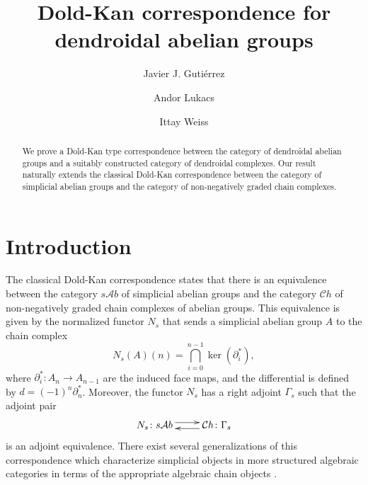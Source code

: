 \documentclass[a4paper]{amsart}
\theoremstyle{plain}
\theoremstyle{definition}
\theoremstyle{remark}
\newcommand{\A}{\mathcal{A}b}
\newcommand{\Ch}{\mathcal{C}h}
\numberwithin{equation}{section}
\numberwithin{figure}{section}
\begin{document}
\title[Dold-Kan correspondence for dendroidal abelian groups]{Dold-Kan correspondence for \\ dendroidal abelian groups}

\author[J. J. Guti\'errez]{Javier J. Guti\'errez}
\address{Centre de Recerca Matem\`atica, Apartat 50, 08193 Bellaterra (Barcelona), Spain}
\author[A. Lukacs]{Andor Lukacs}
\author[I. Weiss]{Ittay Weiss}
\address{Mathematisch Instituut, Postbus 80.010, 3508 TA Utrecht, The Netherlands}


 

\begin{abstract}
We prove a Dold-Kan type correspondence between the category of
dendroidal abelian groups and a suitably constructed category of
dendroidal complexes. Our result naturally extends the classical
Dold-Kan correspondence between the category of simplicial abelian
groups and the category of non-negatively graded chain complexes.
\end{abstract}

\maketitle

\section{Introduction}
The classical Dold-Kan correspondence \cite{dold, kan} states that there is an
equivalence between the category $s\A$ of simplicial abelian groups
and the category $\Ch$ of non-negatively graded chain complexes of
abelian groups. This equivalence is given by the normalized functor
$N_s$ that sends a simplicial abelian group $A$ to the chain complex
$$
N_s(A)(n)=\bigcap_{i=0}^{n-1}\ker(\partial_i^*),
$$
where $\partial_i^*\colon A_n\longrightarrow A_{n-1}$ are the induced face maps, and the differential is defined by $d=(-1)^n\partial_n^*$. Moreover, the
functor $N_s$ has a right adjoint $\Gamma_s$ such that the adjoint pair
$$
\xymatrix{
N_s\colon s\A \ar@<3pt>[r] & \ar@<3pt>[l] \Ch\colon \Gamma_s
}
$$
is an adjoint equivalence. There exist several generalizations of
this correspondence which characterize simplicial objects in more
structured algebraic categories in terms of the appropriate
algebraic chain objects \cite{pirashvili, slominska}.
\end{document}
